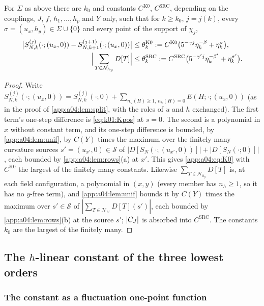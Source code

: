 \begin{corollary}\label{app:a04:cor:rows}
For $\Sigma$ as above there are $k_0$ and constants $C^{\mathrm{K0}}$, $C^{\mathrm{SRC}}$, depending on the couplings, $J$, $f$, $h_1,\dots,h_p$ and $Y$ only, such that for $k\ge k_0$, $j=j(k)$, every $\sigma=(u_x,h_y)\in\Sigma\cup\{0\}$ and every point of the support of $\chi_j$,
\begin{align}
\big|S^{(j)}_{N,k}(\cdot;(u_x,0))-S^{(j+1)}_{N,k+1}(\cdot;(u_x,0))\big|&\le\theta^{\mathrm{K0}}_k:= C^{\mathrm{K0}}\big(5^{-\gamma j}\eta_k^{-\beta}+\eta_k^{\sigma}\big),\label{app:a04:eq:K0}\\
\Big|\sum_{T\in\mathcal N_{h_y}}D[T]\Big|&\le\theta^{\mathrm{SRC}}_k:= C^{\mathrm{SRC}}\big(5^{-\gamma'j}\eta_k^{-\beta'}+\eta_k^{\sigma'}\big).\label{app:a04:eq:SRC}
\end{align}
\end{corollary}
\begin{proof}
Write $S^{(j)}_{N,k}(\cdot;(u_x,0))=S^{(j)}_{N,k}(\cdot;0)+\sum_{n_u(H)\ge1,\,n_h(H)=0}E(H;\cdot;(u_x,0))$ (as in the proof of \cref{app:a04:lem:split}, with the roles of $u$ and $h$ exchanged). The first term's one-step difference is \eqref{eq:k01:Kpos} at $s=0$. The second is a polynomial in $x$ without constant term, and its one-step difference is bounded, by \cref{app:a04:lem:unif}, by $C(Y)$ times the maximum over the finitely many curvature sources $s'=(u_{x'},0)\in\mathcal S$ of $|D[S_N(\cdot;(u_{x'},0))]|+|D[S_N(\cdot;0)]|$, each bounded by \cref{app:a04:lem:rows}(a) at $x'$. This gives \eqref{app:a04:eq:K0} with $C^{\mathrm{K0}}$ the largest of the finitely many constants. Likewise $\sum_{T\in\mathcal N_{h_y}}D[T]$ is, at each field configuration, a polynomial in $(x,y)$ (every member has $n_h\ge1$, so it has no $y$-free term), and \cref{app:a04:lem:unif} bounds it by $C(Y)$ times the maximum over $s'\in\mathcal S$ of $|\sum_{T\in\mathcal N_{h'}}D[T](s')|$, each bounded by \cref{app:a04:lem:rows}(b) at the source $s'$; $|C_J|$ is absorbed into $C^{\mathrm{SRC}}$. The constants $k_0$ are the largest of the finitely many.
\end{proof}

\subsection{The \texorpdfstring{$h$}{h}-linear constant of the three lowest orders}\label{app:a04:low}

\subsubsection{The constant as a fluctuation one-point function}


